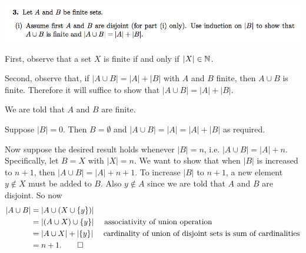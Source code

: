 \documentclass[12pt]{article}
\begin{document}
\subsection*{} %
\includegraphics[width=400pt]{img/iulm-1-3.png}
\begin{mdframed}
First, observe that a set $X$ is finite if and only if $|X| \in \mathbb{N}$.

Second, observe that, if $|A \cup B| = |A| + |B|$ with $A$ and $B$ finite, then
$A \cup B$ is finite. Therefore it will suffice to show that
$|A \cup B| = |A| + |B|$.

We are told that $A$ and $B$ are finite.

Suppose $|B| = 0$. Then $B = \emptyset$ and $|A \cup B| = |A| = |A| + |B|$ as required.

Now suppose the desired result holds whenever $|B| = n$, i.e.
$|A \cup B| = |A| + n$. Specifically, let $B = X$ with $|X| = n$. We want to
show that when $|B|$ is increased to $n+1$, then $|A \cup B| = |A| + n+1$. To
increase $|B|$ to $n+1$, a new element $y \notin X$ must be added to $B$. Also
$y \notin A$ since we are told that $A$ and $B$ are disjoint. So now
\begin{align*}
  |A \cup B| &= |A \cup (X \cup \{y\})|\\
             &= |(A \cup X) \cup \{y\}| ~~~~\text{associativity of union operation}\\
             &= |A \cup X| + |\{y\}| ~~~~\text{cardinality of union of disjoint sets is sum of cardinalities}\\
             &= n + 1. \qed
\end{align*}

\end{mdframed}
\end{document}
